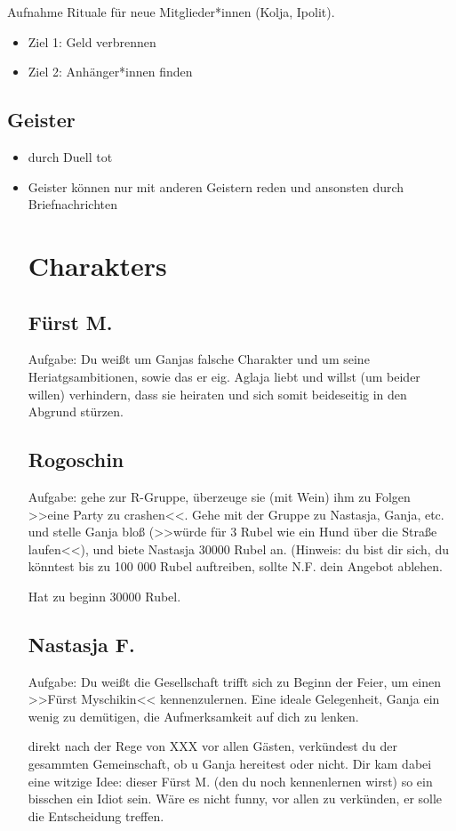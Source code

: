 \documentclass[12pt, a4paper, openany]{report}
\begin{document}
Aufnahme Rituale für neue Mitglieder*innen (Kolja, Ipolit).

\begin{itemize}
\item Ziel 1: Geld verbrennen 
\item Ziel 2: Anhänger*innen finden
\end{itemize}
\section{Geister}
\begin{itemize} 
\item durch Duell tot 
\item Geister können nur mit anderen Geistern reden und ansonsten durch Briefnachrichten 

\chapter{Charakters} 
\section{Fürst M.}
Aufgabe: Du weißt um Ganjas falsche Charakter und um seine Heriatgsambitionen,
sowie das er eig. Aglaja liebt und willst (um beider willen) verhindern, dass
sie heiraten und sich somit beideseitig in den Abgrund stürzen.

\section{Rogoschin} 
Aufgabe: gehe zur R-Gruppe, überzeuge sie (mit Wein) ihm zu Folgen >>eine Party
zu crashen<<. Gehe mit der Gruppe zu Nastasja, Ganja, etc. und stelle Ganja bloß
(>>würde für 3 Rubel wie ein Hund über die Straße laufen<<), und biete Nastasja
30000 Rubel an. (Hinweis: du bist dir sich, du könntest bis zu 100 000 Rubel
auftreiben, sollte N.F. dein Angebot ablehen.

Hat zu beginn 30000 Rubel.

\section{Nastasja F.} 
Aufgabe: Du weißt die Gesellschaft trifft sich zu Beginn der Feier, um einen
>>Fürst Myschikin<< kennenzulernen. Eine ideale Gelegenheit, Ganja ein wenig zu
demütigen, die Aufmerksamkeit auf dich zu lenken.

direkt nach der Rege von XXX vor allen Gästen, verkündest du der gesammten
Gemeinschaft, ob u Ganja hereitest oder nicht. Dir kam dabei eine witzige Idee:
dieser Fürst M. (den du noch kennenlernen wirst) so ein bisschen ein Idiot sein.
Wäre es nicht funny, vor allen zu verkünden, er solle die Entscheidung treffen.


\end{itemize}
\end{document}
